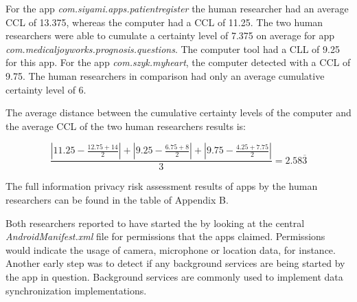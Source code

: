 For the app \textit{com.siyami.apps.patientregister} the human researcher had an average CCL of 13.375, whereas the computer had a CCL of 11.25.
The two human researchers were able to cumulate a certainty level of 7.375 on average for app \linebreak\textit{com.medicaljoyworks.prognosis.questions}.
The computer tool had a CLL of 9.25 for this app.
For the app \textit{com.szyk.myheart}, the computer detected \ipr with a CCL of 9.75.
The human researchers in comparison had only an average cumulative certainty level of 6.

The average distance between the cumulative certainty levels of the computer and the average CCL of the two human researchers results is:

\begin{equation}
	\frac{|11.25 - \frac{12.75 + 14}{2}| + |9.25 - \frac{6.75 + 8}{2}| + |9.75 - \frac{4.25 + 7.75}{2}|}{3}=2.58\overline{3}
\end{equation}

The full information privacy risk assessment results of apps by the human researchers can be found in the table of Appendix B.

Both researchers reported to have started the \sca by looking at the central \textit{AndroidManifest.xml} file for permissions that the apps claimed.
Permissions would indicate the usage of camera, microphone or location data, for instance.
Another early step was to detect if any background services are being started by the app in question.
Background services are commonly used to implement data synchronization implementations.

